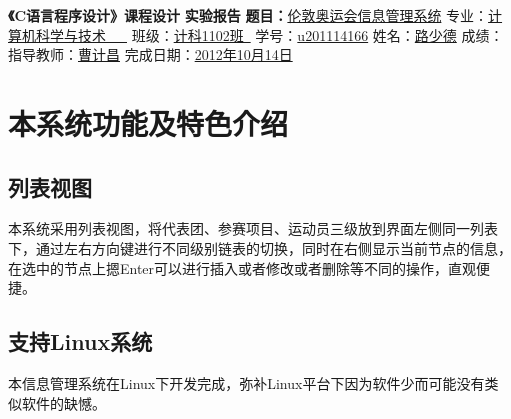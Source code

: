 \documentclass[10pt,a4paper]{article}
\author{路少德}
\begin{document}
\begin{center}
  \LARGE{\textbf{《C语言程序设计》课程设计}}
  \newline
  \newline
  \newline
  \huge{\textbf{实验报告}}
  \newline
  \newline
  \newline
  \vspace{4\baselineskip}
  \huge{\textbf{题目：}\underline{伦敦奥运会信息管理系统}}
  \newline
  \Large{专业：\underline{计算机科学与技术~~~}}
  \newline
  \newline
  \Large{班级：\underline{计科1102班\qquad\quad~}}
  \newline
  \newline
  \Large{学号：\underline{u201114166\qquad\qquad}}
  \newline
  \newline
  \Large{姓名：\underline{路少德\qquad\qquad\qquad}}
  \newline
  \newline
  \Large{成绩：\underline{\qquad\qquad\qquad\qquad\quad}}
  \newline
  \newline
  \newline
  \newline
  \Large{指导教师：\underline{曹计昌\qquad\qquad}}
  \newline
  \newline
  \Large{完成日期：\underline{2012年10月14日\qquad\quad}}
\end{center}
\newpage
\tableofcontents
\newpage
\setlength{\parskip}{1ex plus 0.5ex minus 0.2ex}
\section{本系统功能及特色介绍}
\subsection{列表视图}
本系统采用列表视图，将代表团、参赛项目、运动员三级放到界面左侧同一列表下，通过左右方向键进行不同级别链表的切换，同时在右侧显示当前节点的信息，在选中的节点上摁Enter可以进行插入或者修改或者删除等不同的操作，直观便捷。
\subsection{支持Linux系统}
本信息管理系统在Linux下开发完成，弥补Linux平台下因为软件少而可能没有类似软件的缺憾。
\end{document}
